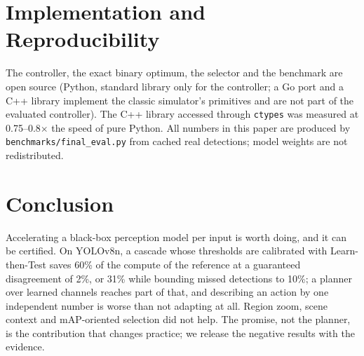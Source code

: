 \documentclass[11pt]{article}
\begin{document}
\section{Implementation and Reproducibility}
The controller, the exact binary optimum, the selector and the benchmark are open source
(Python, standard library only for the controller; a Go port and a C++ library implement the classic
simulator's primitives and are not part of the evaluated controller). The C++ library accessed
through \texttt{ctypes} was measured at 0.75--0.8$\times$ the speed of pure Python. All numbers in
this paper are produced by \texttt{benchmarks/final\_eval.py} from cached real detections; model
weights are not redistributed.

\section{Conclusion}
Accelerating a black-box perception model per input is worth doing, and it can be certified. On YOLOv8n,
a cascade whose thresholds are calibrated with Learn-then-Test saves 60\% of the compute of the reference at a
guaranteed disagreement of 2\%, or 31\% while bounding missed detections to 10\%; a planner over learned channels
reaches part of that, and describing an action by one independent number is worse than not adapting at all.
Region zoom, scene context and mAP-oriented selection did not help. The promise, not the planner, is the contribution
that changes practice; we release the negative results with the evidence.



\end{document}
